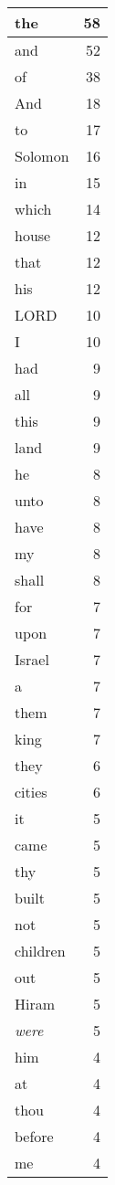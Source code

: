 \begin{center}
\begin{longtable}{l|r}
\hline \hline
\endlastfoot
the & 58 \\ \hline
and & 52 \\ \hline
of & 38 \\ \hline
And & 18 \\ \hline
to & 17 \\ \hline
Solomon & 16 \\ \hline
in & 15 \\ \hline
which & 14 \\ \hline
house & 12 \\ \hline
that & 12 \\ \hline
his & 12 \\ \hline
LORD & 10 \\ \hline
I & 10 \\ \hline
had & 9 \\ \hline
all & 9 \\ \hline
this & 9 \\ \hline
land & 9 \\ \hline
he & 8 \\ \hline
unto & 8 \\ \hline
have & 8 \\ \hline
my & 8 \\ \hline
shall & 8 \\ \hline
for & 7 \\ \hline
upon & 7 \\ \hline
Israel & 7 \\ \hline
a & 7 \\ \hline
them & 7 \\ \hline
king & 7 \\ \hline
they & 6 \\ \hline
cities & 6 \\ \hline
it & 5 \\ \hline
came & 5 \\ \hline
thy & 5 \\ \hline
built & 5 \\ \hline
not & 5 \\ \hline
children & 5 \\ \hline
out & 5 \\ \hline
Hiram & 5 \\ \hline
\emph{were} & 5 \\ \hline
him & 4 \\ \hline
at & 4 \\ \hline
thou & 4 \\ \hline
before & 4 \\ \hline
me & 4 \\ \hline

\end{longtable}
\end{center}
